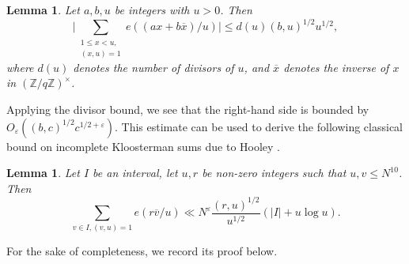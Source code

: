 \documentclass[12pt,reqno]{amsart}
\newtheorem{lemma}[theorem]{Lemma}
\theoremstyle{definition}
\theoremstyle{remark}
\numberwithin{equation}{section}
\renewcommand{\leq}{\leqslant}
\def\eps{\varepsilon}
\newcommand\1{\mathds{1}}
\begin{document}
\begin{lemma} \label{lem2.3}
    Let $a,b,u$ be integers with $u>0$. Then 
    \[ \bigg|\sum_{\substack{1 \leq  x < u, \\ (x,u) = 1}} e( (ax + b \overline{x})/u )\bigg| \leq d(u) (b,u)^{1/2} u^{1/2},\]
    where $d(u)$ denotes the number of divisors of $u$, and $\overline{x}$ denotes the inverse of $x$ in $(\mathbb{Z}/q\mathbb{Z})^{\times}$.
\end{lemma}

Applying the divisor bound, we see that the right-hand side is bounded by $O_{\eps}((b,c)^{1/2} c^{1/2 + \eps})$. This estimate can be used to derive the following classical bound on incomplete Kloosterman sums due to Hooley \cite[Lemma 3]{Hoo1963}. 

\begin{lemma} \label{lem2.4}
    Let $I$ be an interval, let $u,r$ be non-zero integers such that $u, v \leq N^{10}$. Then 
    \[ \sum_{v \in I, (v,u) =1} e( r\overline{v}/u) \ll N^{\eps} \frac{(r,u)^{1/2}}{u^{1/2}} (|I| + u \log u).  \]
\end{lemma}

For the sake of completeness, we record its proof below.
\end{document}

